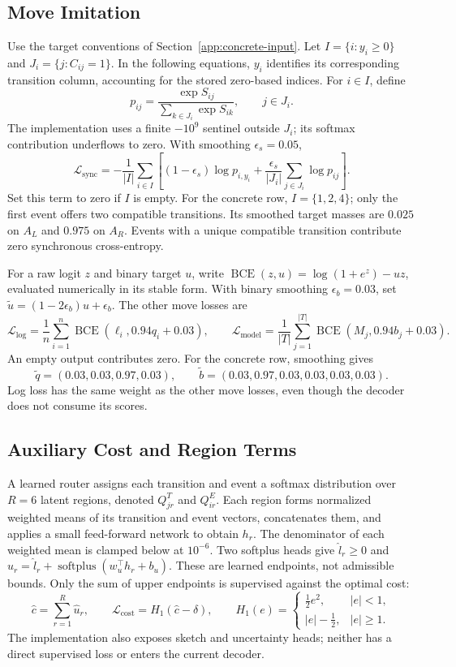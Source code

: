 \documentclass[11pt]{article}
\begin{document}
\subsection{Move Imitation}

Use the target conventions of Section~\ref{app:concrete-input}. Let
$I=\{i:y_i\geq0\}$ and $J_i=\{j:C_{ij}=1\}$. In the following equations,
$y_i$ identifies its corresponding transition column, accounting for the
stored zero-based indices. For $i\in I$, define
\[
 p_{ij}=\frac{\exp S_{ij}}{\sum_{k\in J_i}\exp S_{ik}},\qquad j\in J_i.
\]
The implementation uses a finite $-10^9$ sentinel outside $J_i$; its softmax
contribution underflows to zero. With smoothing $\epsilon_s=0.05$,
\[
 \mathcal L_{\mathrm{sync}}=-\frac{1}{|I|}\sum_{i\in I}
 \left[(1-\epsilon_s)\log p_{i,y_i}
 +\frac{\epsilon_s}{|J_i|}\sum_{j\in J_i}\log p_{ij}\right].
\]
Set this term to zero if $I$ is empty. For the concrete row, $I=\{1,2,4\}$;
only the first event offers two compatible transitions. Its smoothed target
masses are $0.025$ on $A_L$ and $0.975$ on $A_R$. Events with a unique
compatible transition contribute zero synchronous cross-entropy.

For a raw logit $z$ and binary target $u$, write
$\operatorname{BCE}(z,u)=\log(1+e^z)-uz$, evaluated numerically in its stable
form. With binary smoothing $\epsilon_b=0.03$, set
$\widetilde u=(1-2\epsilon_b)u+\epsilon_b$. The other move losses are
\[
 \mathcal L_{\mathrm{log}}=\frac1n\sum_{i=1}^n
   \operatorname{BCE}(\ell_i,0.94q_i+0.03),\qquad
 \mathcal L_{\mathrm{model}}=\frac1{|T|}\sum_{j=1}^{|T|}
   \operatorname{BCE}(M_j,0.94b_j+0.03).
\]
An empty output contributes zero. For the concrete row, smoothing gives
\[
 \widetilde q=(0.03,0.03,0.97,0.03),\qquad
 \widetilde b=(0.03,0.97,0.03,0.03,0.03,0.03).
\]
Log loss has the same weight as the other move losses, even though the decoder
does not consume its scores.

\subsection{Auxiliary Cost and Region Terms}

A learned router assigns each transition and event a softmax distribution
over $R=6$ latent regions, denoted $Q^T_{jr}$ and $Q^E_{ir}$. Each region
forms normalized weighted means of its transition and event vectors,
concatenates them, and applies a small feed-forward network to obtain $h_r$.
The denominator of each weighted mean is clamped below at $10^{-6}$.
Two softplus heads give $\widehat l_r\geq0$ and
$\widehat u_r=\widehat l_r+\operatorname{softplus}(w_u^\top h_r+b_u)$.
These are learned endpoints, not admissible bounds. Only the sum of upper
endpoints is supervised against the optimal cost:
\[
 \widehat c=\sum_{r=1}^R\widehat u_r,\qquad
 \mathcal L_{\mathrm{cost}}=H_1(\widehat c-\delta),\qquad
 H_1(e)=\begin{cases}\tfrac12e^2,&|e|<1,\\|e|-\tfrac12,&|e|\geq1.\end{cases}
\]
The implementation also exposes sketch and uncertainty heads; neither has a
direct supervised loss or enters the current decoder.
\end{document}
